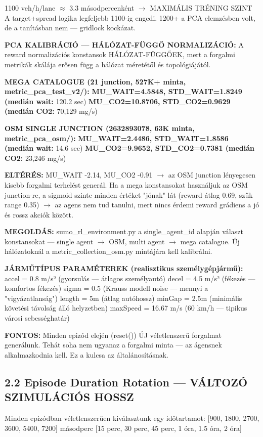 \documentclass[11pt,a4paper]{article}
\begin{document}
1100 veh/h/lane $\approx$ 3.3 másodpercenként $\rightarrow$ MAXIMÁLIS TRÉNING SZINT
A target+spread logika legfeljebb 1100-ig engedi.
1200+ a PCA elemzésben volt, de a tanításban nem — gridlock kockázat.

\textbf{PCA KALIBRÁCIÓ — HÁLÓZAT-FÜGGŐ NORMALIZÁCIÓ:}
A reward normalizációs konstansok HÁLÓZAT-FÜGGŐEK, mert a forgalmi
metrikák skálája erősen függ a hálózat méretétől és topológiájától.

\textbf{MEGA CATALOGUE (21 junction, 527K+ minta, metric\_pca\_test\_v2/):}
\textbf{MU\_WAIT=4.5848, STD\_WAIT=1.8249 (medián wait:} 120.2 sec)
\textbf{MU\_CO2=10.8706, STD\_CO2=0.9629  (medián CO2:} 70,129 mg/s)

\textbf{OSM SINGLE JUNCTION (2632893078, 63K minta, metric\_pca\_osm/):}
\textbf{MU\_WAIT=2.4486, STD\_WAIT=1.8586 (medián wait:} 14.6 sec)
\textbf{MU\_CO2=9.9652,  STD\_CO2=0.7381  (medián CO2:} 23,246 mg/s)

\textbf{ELTÉRÉS:} MU\_WAIT -2.14, MU\_CO2 -0.91 $\rightarrow$ az OSM junction lényegesen
kisebb forgalmi terhelést generál. Ha a mega konstansokat használjuk
az OSM junction-re, a sigmoid szinte minden értéket "jónak" lát
(reward átlag 0.69, szűk range 0.35) $\rightarrow$ az agens nem tud tanulni,
mert nincs érdemi reward grádiens a jó és rossz akciók között.

\textbf{MEGOLDÁS:} sumo\_rl\_environment.py a single\_agent\_id alapján választ
konstansokat — single agent $\rightarrow$ OSM, multi agent $\rightarrow$ mega catalogue.
Új hálózatoknál a metric\_collection\_osm.py mintájára kell kalibrálni.

\textbf{JÁRMŰTÍPUS PARAMÉTEREK (realisztikus személygépjármű):}
accel = 0.8 m/s² (gyorsulás — átlagos személyautó)
decel = 4.5 m/s² (fékezés — komfortos fékezés)
sigma = 0.5 (Krauss modell noise — mennyi a "vigyázatlanság")
length = 5m (átlag autóhossz)
minGap = 2.5m (minimális követési távolság álló helyzetben)
maxSpeed = 16.67 m/s (60 km/h — tipikus városi sebességhatár)

\textbf{FONTOS:} Minden epizód elején (reset()) ÚJ véletlenszerű forgalmat
generálunk. Tehát soha nem ugyanaz a forgalmi minta — az ágensnek
alkalmazkodnia kell. Ez a kulcsa az általánosításnak.

\subsection*{2.2 Episode Duration Rotation — VÁLTOZÓ SZIMULÁCIÓS HOSSZ}
Minden epizódban véletlenszerűen kiválasztunk egy időtartamot:
[900, 1800, 2700, 3600, 5400, 7200] másodperc
[15 perc, 30 perc, 45 perc, 1 óra, 1.5 óra, 2 óra]
\end{document}
